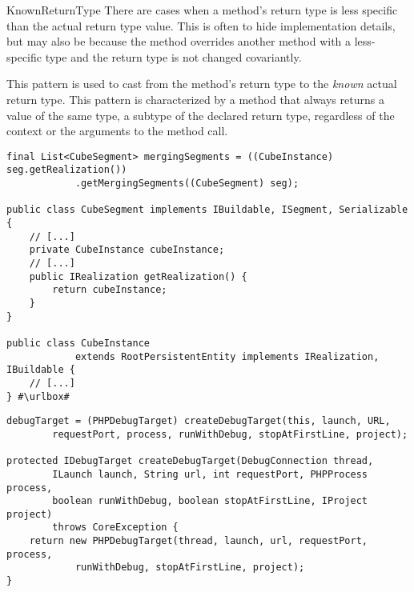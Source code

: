 \begin{pattern}{KnownReturnType}
There are cases when a method's return type is less specific than the
actual return type value.
This is often to hide implementation details, but may also be because the
  method overrides another method with a less-specific type
  and the return type is not changed covariantly.

This pattern is used to cast from the method's return type to
the \emph{known} actual return type.
This pattern is characterized by a method that always returns a
value of the same type, a subtype of the declared return type,
regardless of the context or the arguments to the method call.

\instances{}
\def\urlvar{http://bit.ly/apache_kylin_2SIjooO}


\begin{verbatim}
final List<CubeSegment> mergingSegments = ((CubeInstance) seg.getRealization())
            .getMergingSegments((CubeSegment) seg);

public class CubeSegment implements IBuildable, ISegment, Serializable {
    // [...]
    private CubeInstance cubeInstance;
    // [...]
    public IRealization getRealization() {
        return cubeInstance;
    }
}

public class CubeInstance
            extends RootPersistentEntity implements IRealization, IBuildable {
    // [...]
} #\urlbox#
\end{verbatim}


\def\urlvar{http://bit.ly/eclipse_pdt_2Ekeu9v}

\begin{verbatim}
debugTarget = (PHPDebugTarget) createDebugTarget(this, launch, URL,
        requestPort, process, runWithDebug, stopAtFirstLine, project);

protected IDebugTarget createDebugTarget(DebugConnection thread,
        ILaunch launch, String url, int requestPort, PHPProcess process,
        boolean runWithDebug, boolean stopAtFirstLine, IProject project)
        throws CoreException {
    return new PHPDebugTarget(thread, launch, url, requestPort, process,
            runWithDebug, stopAtFirstLine, project);
}


\end{verbatim}
\end{pattern}
